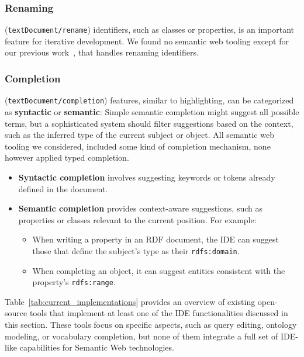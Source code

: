 \subsubsection{Renaming} (\texttt{textDocument/rename}) identifiers, such as classes or properties, is an important feature for iterative development.
We found no semantic web tooling except for our previous work~\cite{JSONLD-LSP}, that handles renaming identifiers.

\subsubsection{Completion} (\texttt{textDocument/completion}) features, similar to highlighting, can be categorized as \textbf{syntactic} or \textbf{semantic}:
Simple semantic completion might suggest all possible terms, but a sophisticated system should filter suggestions based on the context, such as the inferred type of the current subject or object.
All semantic web tooling we considered, included some kind of completion mechanism, none however applied typed completion.


\begin{itemize}
    \item \textbf{Syntactic completion} involves suggesting keywords or tokens already defined in the document.
    \item \textbf{Semantic completion} provides context-aware suggestions, such as properties or classes relevant to the current position. For example:
    \begin{itemize}
        \item When writing a property in an RDF document, the IDE can suggest those that define the subject's type as their \texttt{rdfs:domain}.
        \item When completing an object, it can suggest entities consistent with the property's \texttt{rdfs:range}.
    \end{itemize}
\end{itemize}

Table~\ref{tab:current_implementations} provides an overview of existing open-source tools that implement at least one of the IDE functionalities discussed in this section.
These tools focus on specific aspects, such as query editing, ontology modeling, or vocabulary completion, but none of them integrate a full set of IDE-like capabilities for Semantic Web technologies.

